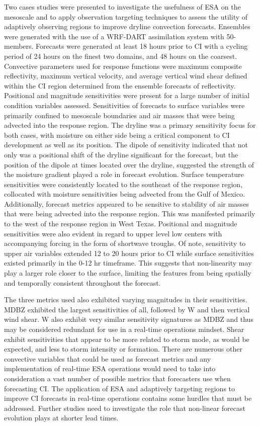 \documentclass{ttuthes2007}
\newcommand{\tab}{\hspace*{2em}}  %
\begin{document}
\tab Two cases studies were presented to investigate the usefulness of ESA on the mesoscale and to apply observation targeting techniques to assess the utility of adaptively observing regions to improve dryline convection forecasts. Ensembles were generated with the use of a WRF-DART assimilation system with 50-members. Forecasts were generated at least 18 hours prior to CI with a cycling period of 24 hours on the finest two domains, and 48 hours on the coarsest. Convective parameters used for response functions were maximum composite reflectivity, maximum vertical velocity, and average vertical wind shear defined within the CI region determined from the ensemble forecasts of reflectivity. Positional and magnitude sensitivities were present for a large number of initial condition variables assessed. Sensitivities of forecasts to surface variables were primarily confined to mesoscale boundaries and air masses that were being advected into the response region. The dryline was a primary sensitivity focus for both cases, with moisture on either side being a critical component to CI development as well as its position. The dipole of sensitivity indicated that not only was a positional shift of the dryline significant for the forecast, but the position of the dipole at times located over the dryline, suggested the strength of the moisture gradient played a role in forecast evolution. Surface temperature sensitivities were consistently located to the southeast of the response region, collocated with moisture sensitivities being advected from the Gulf of Mexico. Additionally, forecast metrics appeared to be sensitive to stability of air masses that were being advected into the response region. This was manifested primarily to the west of the response region in West Texas. Positional and magnitude sensitivities were also evident in regard to upper level low centers with accompanying forcing in the form of shortwave troughs. Of note, sensitivity to upper air variables extended 12 to 20 hours prior to CI while surface sensitivities existed primarily in the 0-12 hr timeframe. This suggests that non-linearity may play a larger role closer to the surface, limiting the features from being spatially and temporally consistent throughout the forecast. 

\tab The three metrics used also exhibited varying magnitudes in their sensitivities. MDBZ exhibited the largest sensitivities of all, followed by W and then vertical wind shear. W also exhibit very similar sensitivity signatures as MDBZ and thus may be considered redundant for use in a real-time operations mindset. Shear exhibit sensitivities that appear to be more related to storm mode, as would be expected, and less to storm intensity or formation. There are numerous other convective variables that could be used as forecast metrics and any implementation of real-time ESA operations would need to take into consideration a vast number of possible metrics that forecasters use when forecasting CI. The application of ESA and adaptively targeting regions to improve CI forecasts in real-time operations contains some hurdles that must be addressed. Further studies need to investigate the role that non-linear forecast evolution plays at shorter lead times. 
\end{document}
